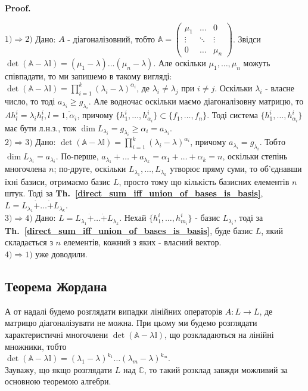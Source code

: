 \documentclass[a4paper, 10pt]{article}
\makeatletter
\theoremstyle{theoremdd}
\newcommand\thref[1]{\textbf{Th.~\ref{#1}}}
\renewenvironment{proof}[1][Proof.\\]{\par
\pushQED{\hfill \qed}%
\normalfont \topsep6\p@\@plus6\p@\relax
\trivlist
\item\relax
{\bfseries
#1\@addpunct{.}}\hspace\labelsep\ignorespaces
}{%
\popQED\endtrivlist\@endpefalse
}
\makeatother
\begin{document}
\begin{proof}
$\boxed{1) \Rightarrow 2)}$ Дано: $A$ - діагоналізовний, тобто $\mathbb{A} = \begin{pmatrix}
\mu_1 & \dots & 0 \\
\vdots & \ddots & \vdots \\
0 & \dots & \mu_n
\end{pmatrix}$. Звідси \\
$\det (\mathbb{A}-\lambda \mathbb{I}) = (\mu_1 - \lambda) \dots (\mu_n - \lambda)$. Але оскільки $\mu_1,\dots,\mu_n$ можуть співпадати, то ми запишемо в такому вигляді:\\
$\det (\mathbb{A}-\lambda \mathbb{I}) = \displaystyle\prod_{i=1}^k (\lambda_i - \lambda)^{\alpha_i}$, де $\lambda_i \neq \lambda_j$ при $i \neq j$. Оскільки $\lambda_i$ - власне число, то тоді $a_{\lambda_i} \geq g_{\lambda_i}$. Але водночас оскільки маємо діагоналізовну матрицю, то $Ah^{i}_l = \lambda_i h^{i}_l, l = \overline{1,\alpha_i}$, причому $\{h^{i}_1,\dots,h^{i}_{\alpha_i}\} \subset \{f_1,\dots,f_n\}$. Тоді система $\{h^{i}_1,\dots,h^{i}_{\alpha_i}\}$ має бути л.н.з., тож $\dim L_{\lambda_i} = g_{\lambda_i} \geq \alpha_i = a_{\lambda_i}$.
\bigskip \\
$\boxed{2) \Rightarrow 3)}$ Дано: $\det (\mathbb{A}-\lambda \mathbb{I}) = \displaystyle\prod_{i=1}^k (\lambda_i - \lambda)^{\alpha_i}$, причому $a_{\lambda_i} = g_{\lambda_i}$. Тобто $\dim L_{\lambda_i} = a_{\lambda_i}$. По-перше, $a_{\lambda_1} + \dots + a_{\lambda_k} = \alpha_1 + \dots + \alpha_k = n$, оскільки степінь многочлена $n$; по-друге, оскільки $L_{\lambda_1},\dots, L_{\lambda_k}$ утворює пряму суми, то об'єднавши їхні базиси, отримаємо базис $L$, просто тому що кількість базисних елементів $n$ штук. Тоді за \thref{direct_sum_iff_union_of_bases_is_basis}, $L = L_{\lambda_1} \dot{+} \dots \dot{+} L_{\lambda_k}$.
\bigskip \\
$\boxed{3) \Rightarrow 4)}$ Дано: $L = L_{\lambda_1} \dot{+} \dots \dot{+} L_{\lambda_k}$. Нехай $\{h_1^i,\dots,h^i_{m_i}\}$ - базис $L_{\lambda_i}$, тоді за \thref{direct_sum_iff_union_of_bases_is_basis}, буде базис $L$, який складається з $n$ елементів, кожний з яких - власний вектор.
\bigskip \\
$\boxed{4) \Rightarrow 1)}$ уже доводили.
\end{proof}

\subsection{Теорема Жордана}
А от надалі будемо розглядати випадки лінійних операторів $A \colon L \to L$, де матрицю діагоналізувати не можна. При цьому ми будемо розглядати характеристичні многочлени $\det (\mathbb{A}-\lambda \mathbb{I})$, що розкладаються на лінійні множники, тобто\\
$\det (\mathbb{A}-\lambda \mathbb{I}) = (\lambda_1 - \lambda)^{k_1} \dots (\lambda_m - \lambda)^{k_m}$.\\
Зауважу, що якщо розглядати $L$ над $\mathbb{C}$, то такий розклад завжди можливий за основною теоремою алгебри.
\end{document}
